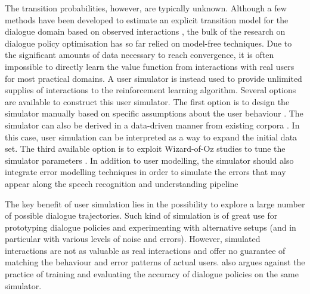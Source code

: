 The transition probabilities, however, are typically unknown.  Although a few methods have been developed to estimate an explicit transition model for the dialogue domain based on observed interactions \citep{SinghLKW02,tetreault2006using},  the bulk of the research on dialogue policy optimisation has so far relied on model-free techniques. Due to the significant amounts of data necessary to reach convergence, it is often impossible to directly learn the value function from interactions with real users for most practical domains.  A user simulator is instead used to provide unlimited supplies of interactions to the reinforcement learning algorithm.   Several options are available to construct this user simulator.  The first option is to design the simulator manually based on specific assumptions about the user behaviour \citep{Pietquin:2006,Schatzmann:2007:AUS:1614108.1614146}.  The simulator can also be derived in a data-driven manner from existing corpora \citep{GeorgilaHL06}.  In this case, user simulation can be interpreted as a way to expand the initial data set.  The third available option is to exploit  Wizard-of-Oz studies to tune the simulator parameters \citep{Rieser:2010:LHM:1735495.1735497}.  In addition to user modelling, the simulator should also integrate error modelling techniques in order to simulate the errors that may appear along the speech recognition and understanding pipeline \citep{SchatzmannTY07,ThomsonGHTY12}

The key benefit of user simulation lies in the possibility to explore a large number of possible dialogue trajectories.  Such kind of simulation is of great use for prototyping dialogue policies and experimenting with alternative setups (and in particular with various levels of noise and errors). However, simulated interactions are not as valuable as real interactions and offer no guarantee of matching the behaviour and error patterns of actual users.  \cite{paek2006} also argues against the practice of training and evaluating the accuracy of dialogue policies on the same simulator.

